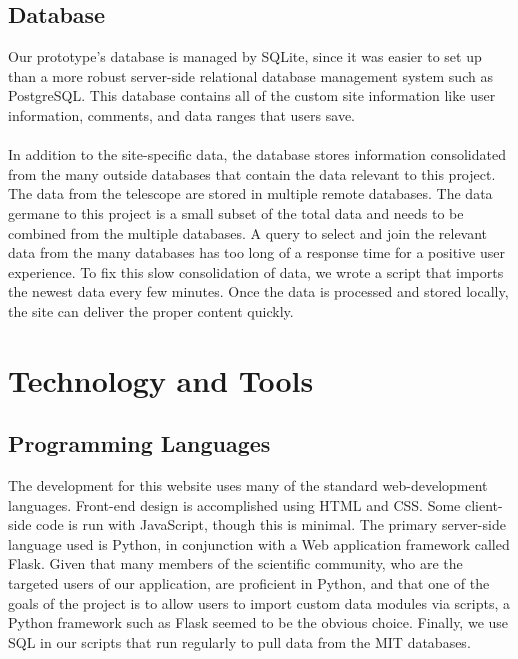 \documentclass[12pt]{article}
\begin{document}
\begin{spacing}{1.5}
\subsection{Database}
Our prototype's database is managed by SQLite, since it was easier to set up than a more robust server-side relational database management system such as PostgreSQL. This database contains all of the custom site information like user information, comments, and data ranges that users save.
\\ \\
In addition to the site-specific data, the database stores information consolidated from the many outside databases that contain the data relevant to this project. The data from the telescope are stored in multiple remote databases. The data germane to this project is a small subset of the total data and needs to be combined from the multiple databases. A query to select and join the relevant data from the many databases has too long of a response time for a positive user experience. To fix this slow consolidation of data, we wrote a script that imports the newest data every few minutes. Once the data is processed and stored locally, the site can deliver the proper content quickly.

\section{Technology and Tools}
\subsection{Programming Languages}
The development for this website uses many of the standard web-development languages. Front-end design is accomplished using HTML and CSS. Some client-side code is run with JavaScript, though this is minimal. The primary server-side language used is Python, in conjunction with a Web application framework called Flask.  Given that many members of the scientific community, who are the targeted users of our application, are proficient in Python, and that one of the goals of the project is to allow users to import custom data modules via scripts, a Python framework such as Flask seemed to be the obvious choice.  Finally, we use SQL in our scripts that run regularly to pull data from the MIT databases.


\end{spacing}
\end{document}
